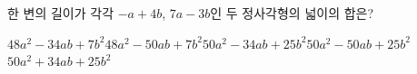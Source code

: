 한 변의 길이가 각각 $-a+4b$, $7a-3b$인 두 정사각형의 넓이의 합은?
\begin{choicesv}{$48a^2-34ab+7b^2$}{$48a^2-50ab+7b^2$}{$50a^2-34ab+25b^2$}{$50a^2-50ab+25b^2$}{$50a^2+34ab+25b^2$}\end{choicesv}
